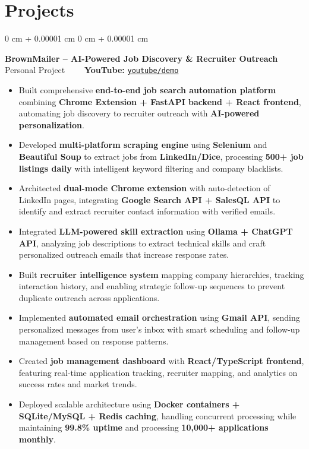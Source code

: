 \documentclass[10pt, letterpaper]{article}
\newenvironment{highlights}{
    \begin{itemize}[
        topsep=0.10 cm,
        parsep=0.10 cm,
        partopsep=0pt,
        itemsep=0pt,
        leftmargin=0 cm + 10pt
    ]
}{
    \end{itemize}
} %
\newenvironment{onecolentry}{
    \begin{adjustwidth}{
        0 cm + 0.00001 cm
    }{
        0 cm + 0.00001 cm
    }
}{
    \end{adjustwidth}
} %
\begin{document}
\section{Projects}
\vspace{0.05 cm}


\begin{onecolentry}
	\textbf{BrownMailer – AI-Powered Job Discovery \& Recruiter Outreach} \hfill Personal Project \ \ \ \ \textbf{YouTube:} \href{https://www.youtube.com/watch?v=mUitmexEZ70}{\texttt{youtube/demo}}
	\begin{highlights}
		\item Built comprehensive \textbf{end-to-end job search automation platform} combining \textbf{Chrome Extension + FastAPI backend + React frontend}, automating job discovery to recruiter outreach with \textbf{AI-powered personalization}.
		\item Developed \textbf{multi-platform scraping engine} using \textbf{Selenium} and \textbf{Beautiful Soup} to extract jobs from \textbf{LinkedIn/Dice}, processing \textbf{500+ job listings daily} with intelligent keyword filtering and company blacklists.
		\item Architected \textbf{dual-mode Chrome extension} with auto-detection of LinkedIn pages, integrating \textbf{Google Search API + SalesQL API} to identify and extract recruiter contact information with verified emails.
		\item Integrated \textbf{LLM-powered skill extraction} using \textbf{Ollama + ChatGPT API}, analyzing job descriptions to extract technical skills and craft personalized outreach emails that increase response rates.
		\item Built \textbf{recruiter intelligence system} mapping company hierarchies, tracking interaction history, and enabling strategic follow-up sequences to prevent duplicate outreach across applications.
		\item Implemented \textbf{automated email orchestration} using \textbf{Gmail API}, sending personalized messages from user's inbox with smart scheduling and follow-up management based on response patterns.
		\item Created \textbf{job management dashboard} with \textbf{React/TypeScript frontend}, featuring real-time application tracking, recruiter mapping, and analytics on success rates and market trends.
		\item Deployed scalable architecture using \textbf{Docker containers + SQLite/MySQL + Redis caching}, handling concurrent processing while maintaining \textbf{99.8\% uptime} and processing \textbf{10,000+ applications monthly}.
	\end{highlights}
\end{onecolentry}
\end{document}
